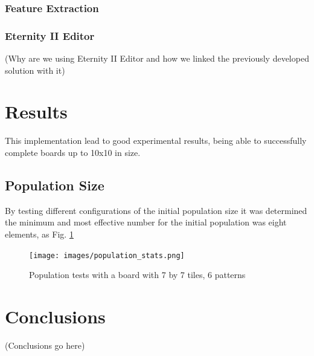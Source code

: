 \documentclass{llncs}
\begin{document}
\subsubsection{Feature Extraction}\label{sec:feature_extraction}

\subsubsection{Eternity II Editor}\label{sec:eternity2_editor}

(Why are we using Eternity II Editor and how we linked the previously developed solution with it)

\section{Results}\label{sec:results}

This implementation lead to good experimental results, being able to successfully complete boards up to 10x10 in size.

\subsection{Population Size}\label{sec:population_size}

By testing different configurations of the initial population size it was determined the minimum and most effective number for the initial population was eight elements, as Fig. \ref{fig:population_stats}

\begin{figure}[h]
	\centering
	\texttt{[image: images/population\_stats.png]}
	\caption{Population tests with a board with 7 by 7 tiles, 6 patterns}
	\label{fig:population_stats}
\end{figure}

\section{Conclusions}\label{sec:conclusions}

(Conclusions go here)
%
%


\end{document}
